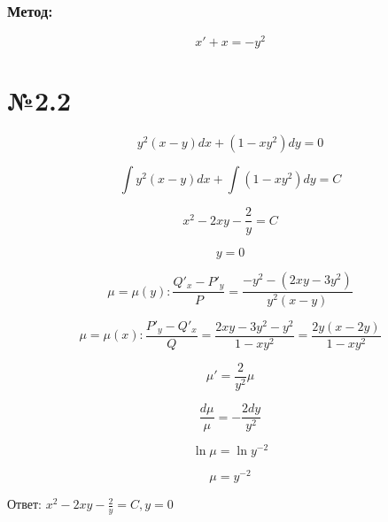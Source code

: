 \documentclass{article}
\begin{document}
\subsubsection*{Метод:}
\begin{equation*}
x' + x = -y^2
\end{equation*}

\section*{№2.2}

\begin{equation*}
y^2(x - y)dx + (1 - xy^2)dy = 0
\end{equation*}

\begin{equation*}
    \int{y^2(x - y)dx} + \int{(1 - xy^2)dy} = C
\end{equation*}

\begin{equation*}
    x^2 - 2xy - \frac{2}{y} = C
\end{equation*}

\begin{equation*}
    y = 0
\end{equation*}

\begin{equation*}
\mu = \mu(y): \frac{Q'_x - P'_y}{P} = \frac{-y^2 - (2xy - 3y^2)}{y^2(x - y)}
\end{equation*}

\begin{equation*}
\mu = \mu(x): \frac{P'_y - Q'_x}{Q} = \frac{2xy - 3y^2 - y^2}{1 - xy^2} = \frac{2y(x - 2y)}{1 - xy^2}
\end{equation*}

\begin{equation*}
    \mu' = \frac{2}{y^2}\mu
\end{equation*}

\begin{equation*}
    \frac{d\mu}{\mu} = - \frac{2dy}{y^2}
\end{equation*}

\begin{equation*}
    \ln{\mu} = \ln{y^{-2}}
\end{equation*}

\begin{equation*}
    \mu = y^{-2}
\end{equation*}

Ответ: $ x^2 - 2xy - \frac{2}{y} = C, y = 0$
\end{document}
